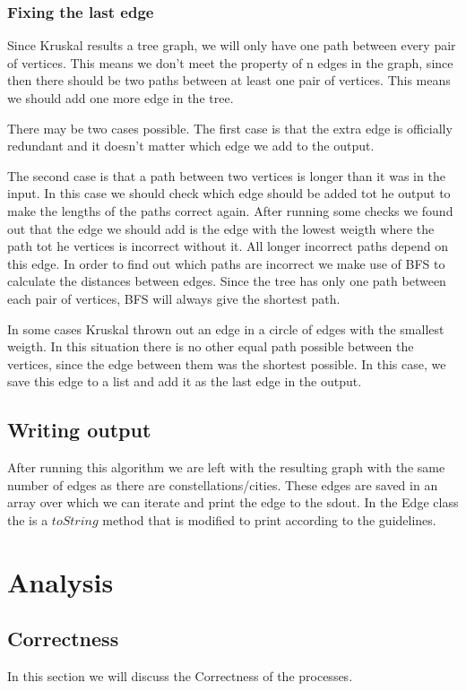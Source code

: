 \documentclass{article}
\begin{document}
\subsubsection{Fixing the last edge}
Since Kruskal results a tree graph, we will only have one path between every pair of vertices. This means we don’t meet the property of n edges in the graph, since then there should be two paths between at least one pair of vertices. This means we should add one more edge in the tree.

There may be two cases possible. The first case is that the extra edge is officially redundant and it doesn’t matter which edge we add to the output.

The second case is that a path between two vertices is longer than it was in the input. In this case we should check which edge should be added tot he output to make the lengths of the paths correct again. After running some checks we found out that the edge we should add is the edge with the lowest weigth where the path tot he vertices is incorrect without it. All longer incorrect paths depend on this edge. In order to find out which paths are incorrect we make use of BFS to calculate the distances between edges. Since the tree has only one path between each pair of vertices, BFS will always give the shortest path.

In some cases Kruskal thrown out an edge in a circle of edges with the smallest weigth. In this situation there is no other equal path possible between the vertices, since the edge between them was the shortest possible. In this case, we save this edge to a list and add it as the last edge in the output.

\subsection{Writing output}
After running this algorithm we are left with the resulting graph with the same number of edges as there are constellations/cities. These edges are saved in an array over which we can iterate and print the edge to the sdout. In the Edge class the is a $toString$ method that is modified to print according to the guidelines.

\newpage
\section{Analysis}

\subsection{Correctness}
In this section we will discuss the Correctness of the processes.
\end{document}
